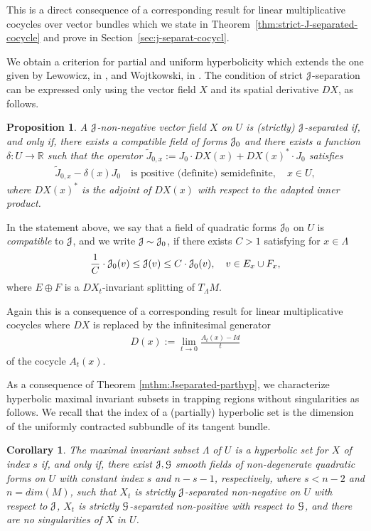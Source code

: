 \documentclass[12pt,reqno]{amsart}
\numberwithin{equation}{section}
\theoremstyle{plain}
\newtheorem{maincorollary}[maintheorem]{Corollary}
\newtheorem{proposition}[theorem]{Proposition}
\theoremstyle{definition}
\newcommand{\RR}{{\mathbb R}}
\newcommand{\G}{\EuScript{G}}
\newcommand{\J}{\EuScript{J}}
\begin{document}
This is a direct consequence of a corresponding result for
linear multiplicative cocycles over vector bundles which we
state in Theorem~\ref{thm:strict-J-separated-cocycle} and
prove in Section~\ref{sec:j-separat-cocycl}.

We obtain a criterion for partial and uniform hyperbolicity
which extends the one given by Lewowicz, in \cite{lewow80},
and Wojtkowski, in \cite{Wojtk01}. The condition of strict
$\J$-separation can be expressed only using the vector field
$X$ and its spatial derivative $DX$, as follows.

\begin{proposition}
  \label{pr:J-separated}
  A $\J$-non-negative vector field $X$ on $U$ is (strictly)
  $\J$-separated if, and only if, there exists a compatible
  field of forms $\J_0$ and there exists a function
  $\delta:U\to\RR$ such that the operator $\tilde J_{0,x}:=
  J_0\cdot DX(x)+DX(x)^*\cdot J_0$ satisfies
  \begin{align*}
    \tilde J_{0,x}-\delta(x)J_0 \quad\text{is positive
      (definite) semidefinite}, \quad x\in U,
  \end{align*}
  where $DX(x)^*$ is the adjoint of $DX(x)$ with respect to
  the adapted inner product.
\end{proposition}

In the statement above, we say that a field of
quadratic forms $\J_0$ on $U$ is \emph{compatible} to $\J$, and we
write $\J\sim\J_0$, if there exists $C>1$ satisfying for
$x\in\Lambda$
\begin{align*}
  \frac1C\cdot\J_0(v)\le \J(v) \le C\cdot\J_0(v),
\quad v\in E_x\cup F_x,
\end{align*}
where $E\oplus F$ is a $DX_t$-invariant splitting of
$T_\Lambda M$.

Again this is a consequence of a corresponding result for
linear multiplicative cocycles where $DX$ is replaced by the
infinitesimal generator
\begin{align*}%
  D(x):=\lim_{t\to0}\frac{A_t(x)-Id}t
\end{align*}
of the cocycle $A_t(x)$.

As a consequence of Theorem \ref{mthm:Jseparated-parthyp}, we
characterize hyperbolic maximal invariant subsets in
trapping regions without singularities as follows.
We recall that the index of a (partially) hyperbolic set is
the dimension of the uniformly contracted subbundle of its
tangent bundle.

\begin{maincorollary}\label{mcor:J-separation-hyperbolicity}
  The maximal invariant subset $\Lambda$ of $U$ is a
  hyperbolic set for $X$ of index $s$ if, and only if, there
  exist $\J,\G$ smooth fields of non-degenerate quadratic
  forms on $U$ with constant index $s$ and $n-s-1$,
  respectively, where $s<n-2$ and $n = dim(M)$, such that
  $X_t$ is strictly $\J$-separated non-negative on $U$ with
  respect to $\J$, $X_t$ is strictly $\G$-separated
  non-positive with respect to $\G$, and there are no
  singularities of $X$ in $U$.
\end{maincorollary}
\end{document}
